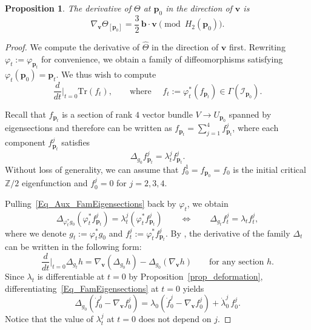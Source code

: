 \documentclass[11pt]{amsart}
\newtheorem{proposition}[theorem]{Proposition}
\newcommand{\Z}{{\mathbb Z}}
\newcommand{\Tr}{\mathrm{Tr}}
\newcommand{\vp}{\varphi}
\newcommand{\MI}{\mathcal{I}}
\newcommand{\mbp}{\mathbf{p}}
\newcommand{\mbv}{\mathbf{v}}
\begin{document}
\begin{proposition}
  \label{Prop_DerivTheta}
	The derivative of  $\Theta$ at $\mbp_0$ in the direction of $\mbv$ is 
	\begin{equation}
		\label{Eq_DerivOfThetaExpression}
	\nabla_\mbv\Theta_{[\mbp_0]} = \frac{3}{2}\, \mathbf{b}\cdot \mbv  \pmod{H_2 (\mbp_0)}.
	\end{equation}
\end{proposition}
\begin{proof}
We compute the derivative of $\hat \Theta$ in the direction of $\mbv$ first. Rewriting $\vp_{t}:=\vp_{\mbp_t}$ for convenience, we obtain a family of diffeomorphisms satisfying $\varphi_t(\mbp_0)=\mbp_t$. We thus wish to compute 
\[
\frac{d}{dt}\Big|_{t=0}\Tr(f_t), \qquad\text{where }\quad f_t := \varphi_t^*(f_{\mbp_t})\in\Gamma(\MI_{\mbp_0}).
\]
  
  Recall that $f_{\mbp_t}$ is a section of rank $4$ vector bundle $V\to U_{\mbp_0}$ spanned by eigensections and therefore can be written as $f_{\mbp_t} = \sum_{j=1}^4 f_{\mbp_t}^j$, where each component $f_{\mbp_t}^j$ satisfies 
  \begin{equation}
  	 \label{Eq_Aux_FamEigensections}
  	\Delta_{g_0} f_{\mbp_t}^j=\lambda_t^j f_{\mbp_t}^j.
  \end{equation}
 Without loss of generality, we can assume that $f_0^1=f_{\mbp_0} = f_0$ is the initial critical $\Z/2$ eigenfunction and $f_0^j=0$ for $j=2,3,4$. 
  
 
Pulling~\eqref{Eq_Aux_FamEigensections} back by $\varphi_t$, we obtain 
\begin{equation}
	\label{Eq_FamEigensections}
\Delta_{\varphi_t^* g_0}(\varphi_t^* f_{\mbp_t}^j)=\lambda_t^j (\varphi_t^* f_{\mbp_t}^j)
\qquad\Longleftrightarrow\qquad
\Delta_{g_t} f_t^j = \lambda_t f_t^j,
\end{equation}
where we denote $g_t := \varphi_t^* g_0$ and $f_t^j:=\varphi_t^* f_{\mbp_t}^j$.
By \cite[Section~5.1]{donaldson2019deformations}, the derivative of the family $\Delta_t$ can be written in the following form: 
\[
\frac{d}{dt}\Big|_{t=0} \Delta_{g_t} h
= \nabla_{\mbv}(\Delta_{g_0} h) - \Delta_{g_0}(\nabla_{\mbv} h)
\qquad\text{for any section } h.
\]
Since $\lambda_t$ is differentiable at $t=0$ by Proposition~\ref{prop_deformation},  differentiating~\eqref{Eq_FamEigensections} at $t=0$ yields
\[
\Delta_{g_0}(\dot{f}_0^j - \nabla_{\mbv} f_0^j)
=
\lambda_0(\dot{f}_0^j - \nabla_{\mbv} f_0^j) + \dot{\lambda}_0^j\, f_0^j.
\]
Notice that the value of $\lambda_t^j$ at $t=0$ does not depend on $j$. 


\end{proof}
\end{document}
